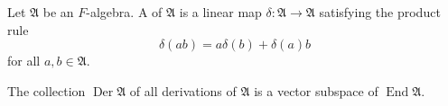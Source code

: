 Let $\mathfrak{A}$ be an $F$-algebra. A  of $\mathfrak{A}$ is a linear map $\delta: \mathfrak{A} \to \mathfrak{A}$ satisfying the product rule
$$\delta(ab) = a\delta(b) + \delta(a)b$$
for all $a, b \in \mathfrak{A}$.

The collection $\operatorname{Der} \mathfrak{A}$ of all derivations of $\mathfrak{A}$ is a vector subspace of $\operatorname{End} \mathfrak{A}$.
